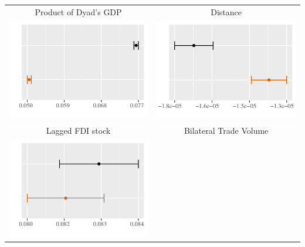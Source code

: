 \documentclass[reqno,onecolumn,letterpaper,12pt]{article}
\begin{document}
\begin{longtable}[!h]{c@{\hskip 0cm}c}
Product of Dyad's GDP & Distance\\
\includegraphics[height=.18\textheight, clip=true, trim=0cm 0cm 0cm .2cm]{draft_figures/plots_pooled/DyadGDPProduct.pdf} &
\includegraphics[height=.18\textheight, clip=true, trim=0cm 0cm 0cm .2cm]{draft_figures/plots_pooled/Distance.pdf}   \\
\pagebreak
Lagged FDI stock & Bilateral Trade Volume \\
\includegraphics[height=.18\textheight, clip=true, trim=0cm 0cm 0cm .2cm]{draft_figures/plots_pooled/LaggedDV.pdf}    &

\end{longtable}
\end{document}
